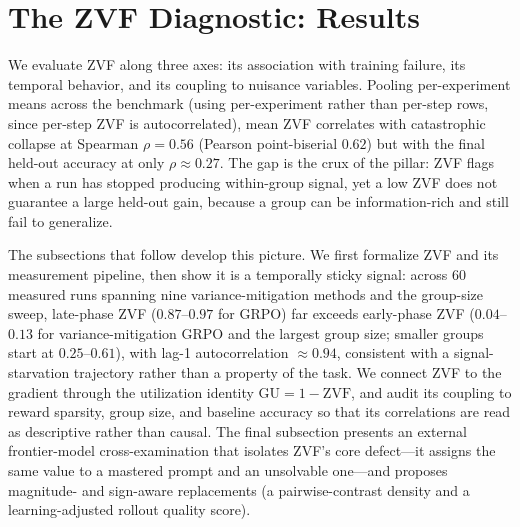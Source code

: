 \section{The ZVF Diagnostic: Results}
\label{sec:p2-results}
We evaluate ZVF along three axes: its association with training failure, its
temporal behavior, and its coupling to nuisance variables. Pooling per-experiment
means across the benchmark (using per-experiment rather than per-step rows, since
per-step ZVF is autocorrelated), mean ZVF correlates with catastrophic collapse
at Spearman $\rho = 0.56$ (Pearson point-biserial $0.62$) but with the final held-out accuracy at
only $\rho \approx 0.27$. The gap is the crux of the pillar: ZVF flags when a run
has stopped producing within-group signal, yet a low ZVF does not guarantee a
large held-out gain, because a group can be information-rich and still fail to
generalize.

The subsections that follow develop this picture. We first formalize ZVF and its
measurement pipeline, then show it is a temporally sticky signal: across 60
measured runs spanning nine variance-mitigation methods and the group-size sweep,
late-phase ZVF ($0.87$--$0.97$ for GRPO) far exceeds early-phase ZVF
($0.04$--$0.13$ for variance-mitigation GRPO and the largest group size; smaller
groups start at $0.25$--$0.61$), with lag-1 autocorrelation $\approx 0.94$, consistent with a
signal-starvation trajectory rather than a property of the task. We connect ZVF to
the gradient through the utilization identity $\mathrm{GU} = 1 - \mathrm{ZVF}$, and
audit its coupling to reward sparsity, group size, and baseline accuracy so that
its correlations are read as descriptive rather than causal. The final subsection
presents an external frontier-model cross-examination that isolates ZVF's core
defect---it assigns the same value to a mastered prompt and an unsolvable one---and
proposes magnitude- and sign-aware replacements (a pairwise-contrast density and a
learning-adjusted rollout quality score).
